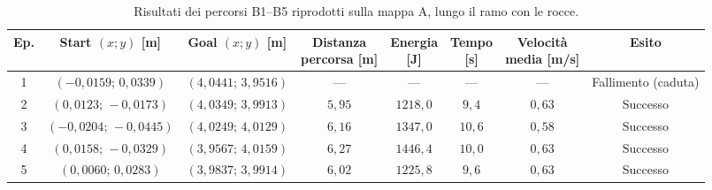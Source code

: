 \begin{table}[H]
\centering
\caption{Risultati dei percorsi B1--B5 riprodotti sulla mappa A, lungo il ramo con le rocce.}
\label{tab:exp1-1-rocks-b}
\begingroup
\fontsize{9.5}{11.5}\selectfont
\setlength{\tabcolsep}{2.5pt}
\renewcommand{\arraystretch}{1.25}
\begin{tabular}{@{}c cc cccc c@{}}
\toprule
Ep. & \shortstack{Start $(x;y)$\\{}[m]} & \shortstack{Goal $(x;y)$\\{}[m]} & \shortstack{Distanza\\percorsa [m]} & \shortstack{Energia\\{}[J]} & \shortstack{Tempo\\{}[s]} & \shortstack{Velocità\\media [m/s]} & Esito \\
\midrule
1 & $(-0{,}0159;\,0{,}0339)$ & $(4{,}0441;\,3{,}9516)$ & --- & --- & --- & --- & Fallimento (caduta) \\
2 & $(0{,}0123;\,-0{,}0173)$ & $(4{,}0349;\,3{,}9913)$ & $5{,}95$ & $1218{,}0$ & $9{,}4$ & $0{,}63$ & Successo \\
3 & $(-0{,}0204;\,-0{,}0445)$ & $(4{,}0249;\,4{,}0129)$ & $6{,}16$ & $1347{,}0$ & $10{,}6$ & $0{,}58$ & Successo \\
4 & $(0{,}0158;\,-0{,}0329)$ & $(3{,}9567;\,4{,}0159)$ & $6{,}27$ & $1446{,}4$ & $10{,}0$ & $0{,}63$ & Successo \\
5 & $(0{,}0060;\,0{,}0283)$ & $(3{,}9837;\,3{,}9914)$ & $6{,}02$ & $1225{,}8$ & $9{,}6$ & $0{,}63$ & Successo \\
\bottomrule
\end{tabular}
\endgroup
\end{table}

